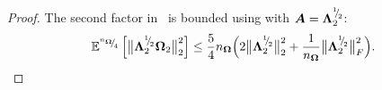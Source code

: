 \begin{proof}
%
    The second factor in~ is bounded using  with $\boldsymbol{A} = \boldsymbol{\Lambda}_2^{{}^{1}{\mskip -5mu/\mskip -3mu}_{2}}$: %
    \begin{equation*}
        \mathbb{E}^{{}^{n_{\boldsymbol{\Omega}}}{\mskip -5mu/\mskip -3mu}_{4}}\left[ \big\| \boldsymbol{\Lambda}_2^{{}^{1}{\mskip -5mu/\mskip -3mu}_{2}} \boldsymbol{\Omega}_2 \big\|_2^2 \right]
        \leq \frac{5}{4} n_{\boldsymbol{\Omega}} \Big( 2 \big\| \boldsymbol{\Lambda}_2^{{}^{1}{\mskip -5mu/\mskip -3mu}_{2}} \big\|_2^2 + \frac{1}{n_{\boldsymbol{\Omega}}} \big\| \boldsymbol{\Lambda}_2^{{}^{1}{\mskip -5mu/\mskip -3mu}_{2}} \big\|_F^2 \Big).
    \end{equation*}

\end{proof}
